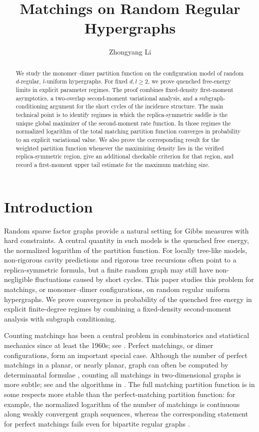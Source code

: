 \documentclass[11pt]{amsart}
\title{Matchings on Random Regular Hypergraphs}
\author{Zhongyang Li}
\theoremstyle{plain}
\numberwithin{equation}{section}
\numberwithin{theorem}{section}
\numberwithin{figure}{section}
\begin{document}
\begin{abstract}
We study the monomer--dimer partition function on the configuration model of
random $d$-regular, $l$-uniform hypergraphs.  For fixed $d,l\ge2$, we prove
quenched free-energy limits in explicit parameter regimes.  The proof combines
fixed-density first-moment asymptotics, a two-overlap second-moment variational
analysis, and a subgraph-conditioning argument for the short cycles of the
incidence structure.  The main technical point is to identify regimes in which
the replica-symmetric saddle is the unique global maximizer of the second-moment
rate function.  In those regimes the normalized logarithm of the total matching
partition function converges in probability to an explicit variational value.  We
also prove the corresponding result for the weighted partition function whenever
the maximizing density lies in the verified replica-symmetric region, give an
additional checkable criterion for that region, and record a first-moment upper
tail estimate for the maximum matching size.
\end{abstract}

\maketitle

\section{Introduction}

Random sparse factor graphs provide a natural setting for Gibbs measures with
hard constraints.  A central quantity in such models is the quenched free energy,
the normalized logarithm of the partition function.  For locally tree-like
models, non-rigorous cavity predictions and rigorous tree recursions often point
to a replica-symmetric formula, but a finite random graph may still have
non-negligible fluctuations caused by short cycles.  This paper studies this
problem for matchings, or monomer--dimer configurations, on random regular
uniform hypergraphs.  We prove convergence in probability of the quenched free
energy in explicit finite-degree regimes by combining a fixed-density
second-moment analysis with subgraph conditioning.

Counting matchings has been a central problem in combinatorics and statistical
mechanics since at least the 1960s; see \cite{ER66,HL70,HL72}.  Perfect
matchings, or dimer configurations, form an important special case.  Although the
number of perfect matchings in a planar, or nearly planar, graph can often be
computed by determinantal formulae \cite{Kas61,TF61,RK09}, counting all
matchings in two-dimensional graphs is more subtle; see \cite{JM87} and the
algorithms in \cite{CRS96,GK09}.  The full matching partition function is in
some respects more stable than the perfect-matching partition function: for
example, the normalized logarithm of the number of matchings is continuous along
weakly convergent graph sequences, whereas the corresponding statement for
perfect matchings fails even for bipartite regular graphs \cite{ACFK16}.
\end{document}
